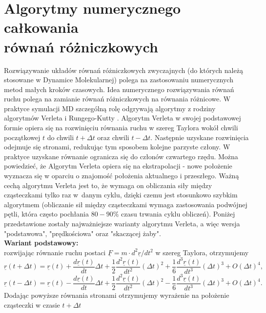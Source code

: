 \documentclass[12pt,a4paper,openright]{report} %
\begin{document}
\section{Algorytmy numerycznego całkowania \\ równań różniczkowych}
\label{algolnum}
Rozwiązywanie układów równań różniczkowych zwyczajnych (do których należą stosowane w Dynamice Molekularnej) polega na zastosowaniu numerycznych metod małych kroków czasowych. Idea numerycznego rozwiązywania równań ruchu polega na zamianie równań różniczkowych na równania różnicowe. W praktyce symulacji MD szczególną rolę odgrywają algorytmy z rodziny algorytmów Verleta \cite{Verlet1, Verlet2} i Rungego-Kutty \cite{AllenTildesley}. Algorytm Verleta w swojej podstawowej formie opiera się na rozwinięciu równania ruchu w szereg Taylora wokół chwili początkowej $t$ do chwili $t+\Delta t$ oraz chwili $t-\Delta t$. Następnie uzyskane rozwinięcia odejmuje się stronami, redukując tym sposobem kolejne parzyste człony. W praktyce uzyskane równanie ogranicza się do członów czwartego rzędu. Można powiedzieć, że Algorytm Verleta opiera się na ekstrapolacji - nowe położenie wyznacza się w oparciu o znajomość położenia aktualnego i przeszłego. Ważną cechą algorytmu Verleta jest to, że wymaga on obliczania siły między cząsteczkami tylko raz w~danym cyklu, dzięki czemu jest stosunkowo szybkim algorytmem (obliczanie sił między cząsteczkami wymaga zastosowania podwójnej pętli, która często pochłania $80-90 \%$ czasu trwania cyklu obliczeń). Poniżej przedstawione zostały najważniejsze warianty algorytmu Verleta, a więc wersja "podstawowa", "prędkościowa" oraz "skaczącej żaby".\\
\textbf{Wariant podstawowy:}\\
rozwijając równanie ruchu postaci $\underline{F}=m \cdot d^2 \underline{r} / dt^2$ w szereg Taylora, otrzymujemy
\begin{equation}
\underline{r}(t+\Delta t) = \underline{r}(t)+ \frac{d \underline{r}(t)}{dt} \Delta t + \frac{1}{2} \frac{d^2 \underline{r}(t)}{dt^2} (\Delta t)^2 + \frac{1}{6} \frac{d^3 \underline{r}(t)}{dt^3} (\Delta t)^3 + O(\Delta t)^4,
\end{equation}
\begin{equation}
\underline{r}(t-\Delta t) = \underline{r}(t) - \frac{d \underline{r}(t)}{dt} \Delta t + \frac{1}{2} \frac{d^2 \underline{r}(t)}{dt^2} (\Delta t)^2 - \frac{1}{6} \frac{d^3 \underline{r}(t)}{dt^3} (\Delta t)^3 + O(\Delta t)^4.
\end{equation}
Dodając powyższe równania stronami otrzymujemy wyrażenie na położenie cząsteczki w czasie $t+\Delta t$
\end{document}
